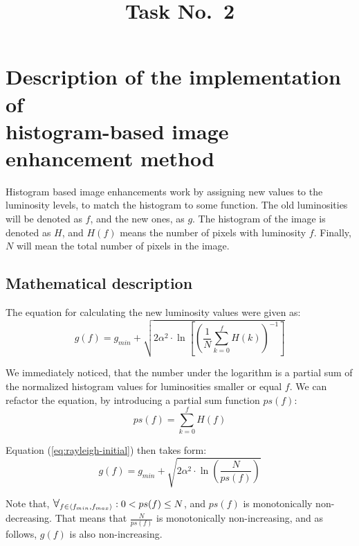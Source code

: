 \documentclass[12pt]{article}
\title{Task No.~2}
\begin{document}
\maketitle

\section{Description of the implementation of \texorpdfstring{\\ }{} histogram-based image enhancement method}
Histogram based image enhancements work by assigning new values to the luminosity levels, to match the histogram to some function.
The old luminosities will be denoted as $f$, and the new ones, as $g$.
The histogram of the image is denoted as $H$, and $H(f)$ means the number of pixels with luminosity $f$.
Finally, $N$ will mean the total number of pixels in the image.

\subsection{Mathematical description}

The equation for calculating the new luminosity values were given as:
\begin{equation}
    g(f) = g_{min} +\sqrt{
        2 \alpha^2 \cdot \ln\left[
            \left(
            \frac{1}{N} \sum\limits_{k=0}^f H(k)
            \right)^{-1}
            \right]
    }
    \label{eq:rayleigh-initial}
\end{equation}

We immediately noticed, that the number under the logarithm is a partial sum of the normalized histogram values for luminosities smaller or equal $f$.
We can refactor the equation, by introducing a partial sum function $ps(f)$:
\begin{equation}
    ps(f) = \sum\limits_{k=0}^f H(f)
\end{equation}

Equation (\ref{eq:rayleigh-initial}) then takes form:
\begin{equation}
    g(f) = g_{min} + \sqrt{
        2 \alpha^2 \cdot \ln
        \left(
        \frac{N}{ps(f)}
        \right)}
\end{equation}

Note that,
\(
\bigforall_{f \in \langle f_{min},f_{max}\rangle} : 0 < ps(f) \leq N
\), and $ps(f)$ is monotonically non-decreasing.
That means that $\frac{N}{ps(f)}$ is monotonically non-increasing, and as follows, $g(f)$ is also non-increasing.
\end{document}
